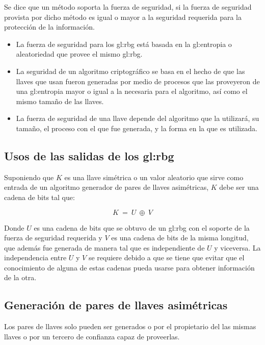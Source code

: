 Se dice que un método soporta la fuerza de seguridad, si la fuerza de
seguridad provista por dicho método es igual o mayor a la seguridad
requerida para la protección de la información.

\begin{itemize}
  \item La fuerza de seguridad para los \gls{gl:rbg} está basada en la
    \gls{gl:entropia} o aleatoriedad que provee el mismo \gls{gl:rbg}.

  \item La seguridad de un algoritmo criptográfico se basa en el hecho de
    que las llaves que usan fueron generadas por medio de procesos que las
    proveyeron de una \gls{gl:entropia} mayor o igual a la necesaria para el
    algoritmo, así como el mismo tamaño de las llaves.

  \item La fuerza de seguridad de una llave depende del algoritmo que la
    utilizará, su tamaño, el proceso con el que fue generada, y la forma en
    la que es utilizada.

\end{itemize}

\subsection{Usos de las salidas de los \gls{gl:rbg}}
Suponiendo que $K$ es una llave simétrica o un valor aleatorio que sirve
como entrada de un algoritmo generador de pares de llaves asimétricas, $K$
debe ser una cadena de bits tal que:

\begin{equation}
  \label{bits_K}
  K\: =\: U\: \oplus\: V
\end{equation}

Donde $U$ es una cadena de bits que se obtuvo de un \gls{gl:rbg} con el
soporte de la fuerza de seguridad requerida y $V$ es una cadena de bits de la
misma longitud, que además fue generada de manera tal que es independiente de
$U$ y viceversa. La independencia entre $U$ y $V$ se requiere debido a que se
tiene que evitar que el conocimiento de alguna de estas cadenas pueda usarse
para obtener información de la otra.

\subsection{Generación de pares de llaves asimétricas}
Los pares de llaves solo pueden ser generados o por el propietario del las
mismas llaves o por un tercero de confianza capaz de proveerlas.

